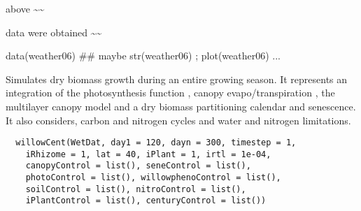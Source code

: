\documentclass[letterpaper]{book}
\begin{document}
%
\begin{Details}\relax

above \textasciitilde{}\textasciitilde{}
\end{Details}
%
\begin{Source}\relax

data were obtained \textasciitilde{}\textasciitilde{}
\end{Source}
%
\begin{Examples}
\begin{ExampleCode}
data(weather06)
## maybe str(weather06) ; plot(weather06) ...
\end{ExampleCode}
\end{Examples}
%
\begin{Description}\relax
Simulates dry biomass growth during an entire growing
season.  It represents an integration of the
photosynthesis function , canopy
evapo/transpiration , the multilayer
canopy model  and a dry biomass
partitioning calendar and senescence. It also considers,
carbon and nitrogen cycles and water and nitrogen
limitations.
\end{Description}
%
\begin{Usage}
\begin{verbatim}
  willowCent(WetDat, day1 = 120, dayn = 300, timestep = 1,
    iRhizome = 1, lat = 40, iPlant = 1, irtl = 1e-04,
    canopyControl = list(), seneControl = list(),
    photoControl = list(), willowphenoControl = list(),
    soilControl = list(), nitroControl = list(),
    iPlantControl = list(), centuryControl = list())
\end{verbatim}
\end{Usage}
%
\end{document}
